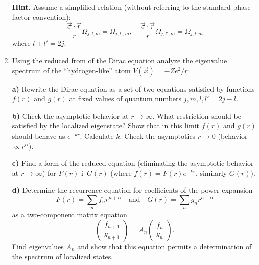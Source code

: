 \documentclass[a4paper,11pt]{article}
\begin{document}
\begin{enumerate}
  \textbf{Hint.} Assume a simplified relation (without referring to
  the standard phase factor convention):
  \begin{equation}
    \label{eq:29}
    \frac{ \vec{ \sigma } \cdot \vec{ r } }{ r } \Omega_{ j, l, m }
    = \Omega_{ j, l', m }, \quad
    \frac{ \vec{ \sigma } \cdot \vec{ r } }{ r } \Omega_{ j, l', m }
    = \Omega_{ j, l, m }
  \end{equation}
  where $l + l' = 2 j$.

\item Using the reduced from of the Dirac equation analyze the
  eigenvalue spectrum of the ``hydrogen-like'' atom
  $V( \vec{ x } ) = -Z e^{ 2 } / r$:

  \textbf{a)} Rewrite the Dirac equation as a set of two equations
  satisfied by functions $f( r )$ and $g( r )$ at fixed values of
  quantum numbers $j, m, l, l' = 2j - l$.

  \textbf{b)} Check the asymptotic behavior at $r \to \infty$. What
  restriction should be satisfied by the localized eigenstate? Show
  that in this limit $f( r )$ and $g( r )$ should behave as
  $e^{ -kr }$. Calculate $k$. Check the asymptotics $r \to 0$ (behavior
  $\varpropto r^{ \alpha }$).

  \textbf{c)} Find a form of the reduced equation (eliminating the
  asymptotic behavior at $r \to \infty$) for $F( r )$ i~$G( r )$ (where
  $f( r ) = F( r ) e^{ -kr }$, similarly $G( r )$).

  \textbf{d)} Determine the recurrence equation for coefficients of
  the power expansion
  \begin{equation}
    \label{eq:30}
    F( r ) = \sum_{ n } f_{ n } r^{ n + \alpha } \quad \textrm{and} \quad
    G( r ) = \sum_{ n } g_{ n } r^{ n + \alpha }
  \end{equation}
  as a two-component matrix equation
  \begin{equation}
    \label{eq:31}
    \begin{pmatrix}
      f_{ n + 1 } \\
      g_{ n + 1 }
    \end{pmatrix}
    =
    A_{ n }
    \begin{pmatrix}
      f_{ n } \\
      g_{ n }
    \end{pmatrix}.
  \end{equation}
  Find eigenvalues $A_{ n }$ and show that this equation permits a
  determination of the spectrum of localized states.



\end{enumerate}
\end{document}
